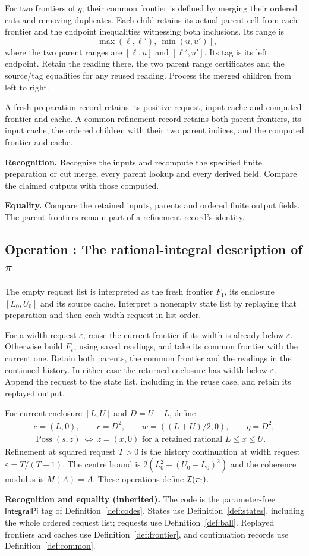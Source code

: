 \documentclass[11pt]{article}
\newcounter{definition}
\newcommand{\entry}[2]{%
  \refstepcounter{definition}\subsection*{#1 \thedefinition: #2}}
\newcommand{\operation}[1]{\entry{Operation}{#1}}
\newcommand{\Poss}{\operatorname{Poss}}
\newcommand{\interp}[1]{\mathcal I(#1)}
\newcommand{\checks}[2]{\begin{samepage}\par
  \textbf{Recognition.} #1\par\nopagebreak[4]
  \textbf{Equality.} #2\par\end{samepage}}
\newcommand{\inheritedchecks}[1]{\par
  \textbf{Recognition and equality (inherited).} #1\par}
\begin{document}
For two frontiers of $g$, their common frontier is defined by merging
their ordered cuts and removing duplicates. Each child retains its actual
parent cell from each frontier and the endpoint inequalities witnessing
both inclusions. Its range is
\[
                  [\max(\ell,\ell'),\ \min(u,u')],
\]
where the two parent ranges are $[\ell,u]$ and $[\ell',u']$.
Its tag is its left endpoint. Retain the reading there, the two parent
range certificates and the source/tag equalities for any reused reading.
Process the merged children from left to right.

A fresh-preparation record retains its positive request, input cache and
computed frontier and cache. A common-refinement record retains both
parent frontiers, its input cache, the ordered children with their two
parent indices, and the computed frontier and cache.
\checks{Recognize the inputs and recompute the specified finite
preparation or cut merge, every parent lookup and every derived field.
Compare the claimed outputs with those computed.}
{Compare the retained inputs, parents and ordered finite output fields.
The parent frontiers remain part of a refinement record's identity.}

\operation{The rational-integral description of \texorpdfstring{$\pi$}{pi}}\label{def:integral}
The empty request list is interpreted as the fresh frontier $F_1$, its
enclosure $[L_0,U_0]$ and its source cache. Interpret a nonempty state list
by replaying that preparation and then each width request in list order.

For a width request $\varepsilon$, reuse the current frontier if its
width is already below $\varepsilon$. Otherwise build $F_\varepsilon$,
using saved readings, and take its common frontier with the current one.
Retain both parents, the common frontier and the readings in the continued
history. In either case the returned enclosure has width below
$\varepsilon$. Append the request to the state list, including in the reuse
case, and retain its replayed output.

For current enclosure $[L,U]$ and $D=U-L$, define
\[
\begin{gathered}
 c=(L,0),\qquad r=D^2,\qquad
 w=((L+U)/2,0),\qquad \eta=D^2,\\
 \Poss(s,z)\ \Longleftrightarrow\
       z=(x,0)\text{ for a retained rational }L\leq x\leq U.
\end{gathered}
\]
Refinement at squared request $T>0$ is the history continuation at width
request $\varepsilon=T/(T+1)$. The centre bound is
$2(L_0^2+(U_0-L_0)^2)$ and the coherence modulus is $M(A)=A$.
These operations define $\interp{\pi_{\rm I}}$.
\inheritedchecks{The code is the parameter-free $\mathsf{IntegralPi}$
tag of Definition~\ref{def:codes}. States use Definition~\ref{def:states},
including the whole ordered request list; requests use
Definition~\ref{def:ball}. Replayed frontiers and caches use
Definition~\ref{def:frontier}, and continuation records use
Definition~\ref{def:common}.}
\end{document}
